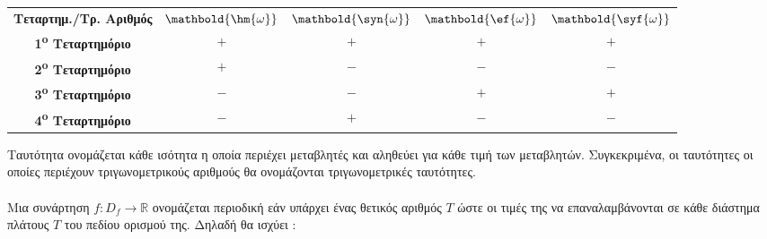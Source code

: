 \documentclass[twoside,nofonts,internet,shmeiwseis]{thewria}
\newcommand{\tss}[1]{\textsuperscript{#1}}
\begin{document}
\begin{center}
\begin{minipage}[m]{6cm}
\centering
\begin{tabular}{c|cccc}
\hline \textbf{Τεταρτημ./Τρ. Αριθμός} & \textbf{{$ \mathbold{\hm{\omega}} $}} & \textbf{{$ \mathbold{\syn{\omega}} $}} & \textbf{{$ \mathbold{\ef{\omega}} $}} & \textbf{{$ \mathbold{\syf{\omega}} $}} \rule[-2ex]{0pt}{5ex}\\ 
\hhline{=====} \rule[-2ex]{0pt}{5ex} \textbf{1\tss{o} Τεταρτημόριο} & $ + $ & $ + $ & $ + $ & $ + $ \\ 
\rule[-2ex]{0pt}{5ex} \textbf{2\tss{o} Τεταρτημόριο} & $ + $ & $ - $ & $ - $ & $ - $ \\ 
\rule[-2ex]{0pt}{5ex} \textbf{3\tss{o} Τεταρτημόριο} & $ - $ & $ - $ & $ + $ & $ + $ \\ 
\rule[-2ex]{0pt}{5ex} \textbf{4\tss{o} Τεταρτημόριο} & $ - $ & $ + $ & $ - $ & $ - $ \\ 
\hline 
\end{tabular}
\end{minipage}\hspace{4cm}
\begin{minipage}[m]{5cm}
\centering
{}
\end{minipage}
\end{center}
Ταυτότητα ονομάζεται κάθε ισότητα η οποία περιέχει μεταβλητές και αληθεύει για κάθε τιμή των μεταβλητών. Συγκεκριμένα, οι ταυτότητες οι οποίες περιέχουν τριγωνομετρικούς αριθμούς θα ονομάζονται τριγωνομετρικές ταυτότητες.\\\\
Μια συνάρτηση $ f:D_f\rightarrow\mathbb{R} $ ονομάζεται περιοδική εάν υπάρχει ένας θετικός αριθμός $ T $ ώστε οι τιμές της να επαναλαμβάνονται σε κάθε διάστημα πλάτους $ T $ του πεδίου ορισμού της. Δηλαδή θα ισχύει :
\end{document}
